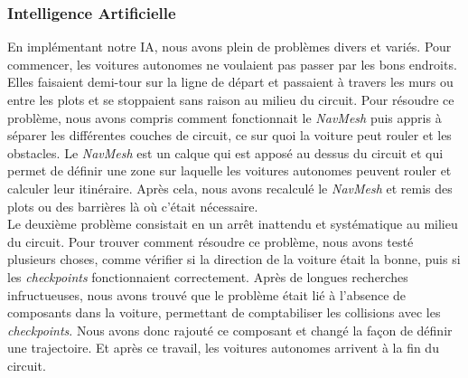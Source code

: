 \documentclass[12pt,a4paper]{article}
\newcommand{\AI}{Intelligence Artificielle}
\begin{document}
            \subsubsection{\AI}
                En implémentant notre IA, nous avons plein de problèmes divers et variés. Pour 
                commencer, les voitures autonomes ne voulaient pas passer par les bons endroits. Elles 
                faisaient demi-tour sur la ligne de départ et passaient à travers les murs ou entre les 
                plots et se stoppaient sans raison au milieu du circuit. Pour résoudre ce problème, nous
                avons compris comment fonctionnait le \textit{NavMesh} puis appris à séparer les 
                différentes couches de circuit, ce sur quoi la voiture peut rouler et les obstacles. Le 
                \textit{NavMesh} est un calque qui est apposé au dessus du circuit et qui permet de
                définir une zone sur laquelle les voitures autonomes peuvent rouler et calculer leur
                itinéraire. Après cela, nous avons recalculé le \textit{NavMesh} et remis des plots
                ou des barrières là où c'était nécessaire.\\
                Le deuxième problème consistait en un arrêt inattendu et systématique au milieu du 
                circuit. Pour trouver comment résoudre ce problème, nous avons testé plusieurs choses, 
                comme vérifier si la direction de la voiture était la bonne, puis si les 
                \textit{checkpoints} fonctionnaient correctement. Après de longues recherches 
                infructueuses, nous avons trouvé que le problème était lié à l'absence de composants 
                dans la voiture, permettant de comptabiliser les collisions avec les 
                \textit{checkpoints}. Nous avons donc rajouté ce composant et changé la façon de définir
                une trajectoire. Et après ce travail, les voitures autonomes arrivent à la fin du 
                circuit.
\end{document}
